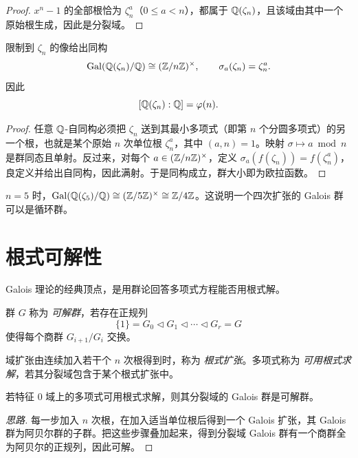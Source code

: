 \begin{proof}
$x^n-1$ 的全部根恰为 $\zeta_n^a$（$0\le a<n$），都属于 $\mathbb{Q}(\zeta_n)$，且该域由其中一个原始根生成，因此是分裂域。
\end{proof}

\begin{theorem}
限制到 $\zeta_n$ 的像给出同构
\[
 \mathrm{Gal}(\mathbb{Q}(\zeta_n)/\mathbb{Q})\cong (\mathbb{Z}/n\mathbb{Z})^\times,
\qquad \sigma_a(\zeta_n)=\zeta_n^a.
\]
因此
\[
 [\mathbb{Q}(\zeta_n):\mathbb{Q}]=\varphi(n).
\]
\end{theorem}

\begin{proof}
任意 $\mathbb{Q}$-自同构必须把 $\zeta_n$ 送到其最小多项式（即第 $n$ 个分圆多项式）的另一个根，也就是某个原始 $n$ 次单位根 $\zeta_n^a$，其中 $(a,n)=1$。映射 $\sigma\mapsto a\bmod n$ 是群同态且单射。反过来，对每个 $a\in (\mathbb{Z}/n\mathbb{Z})^\times$，定义 $\sigma_a(f(\zeta_n))=f(\zeta_n^a)$，良定义并给出自同构，因此满射。于是同构成立，群大小即为欧拉函数。
\end{proof}

\begin{example}
$n=5$ 时，$\mathrm{Gal}(\mathbb{Q}(\zeta_5)/\mathbb{Q})\cong (\mathbb{Z}/5\mathbb{Z})^\times\cong \mathbb{Z}/4\mathbb{Z}$。这说明一个四次扩张的 Galois 群可以是循环群。
\end{example}

\section{根式可解性}

Galois 理论的经典顶点，是用群论回答多项式方程能否用根式解。

\begin{definition}
群 $G$ 称为 \emph{可解群}，若存在正规列
\[
 \{1\}=G_0\triangleleft G_1\triangleleft \cdots\triangleleft G_r=G
\]
使得每个商群 $G_{i+1}/G_i$ 交换。
\end{definition}

\begin{definition}
域扩张由连续加入若干个 $n$ 次根得到时，称为 \emph{根式扩张}。多项式称为 \emph{可用根式求解}，若其分裂域包含于某个根式扩张中。
\end{definition}

\begin{theorem}[基本方向]
若特征 $0$ 域上的多项式可用根式求解，则其分裂域的 Galois 群是可解群。
\end{theorem}

\begin{proof}[思路]
每一步加入 $n$ 次根，在加入适当单位根后得到一个 Galois 扩张，其 Galois 群为阿贝尔群的子群。把这些步骤叠加起来，得到分裂域 Galois 群有一个商群全为阿贝尔的正规列，因此可解。
\end{proof}

